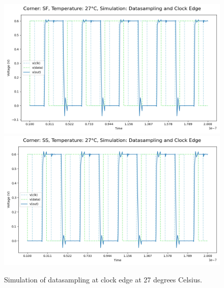 \begin{figure}[H]
    \vspace{5pt}
    \includegraphics[height= 0.21\textheight]{figures/aimspice/0.600_0.1u_0.1u_0.3u_0.1u/functionality/SF27W1.png}
    \vspace{5pt}
    \includegraphics[height= 0.21\textheight]{figures/aimspice/0.600_0.1u_0.1u_0.3u_0.1u/functionality/SS27W1.png}
    \caption{Simulation of datasampling at clock edge at 27 degrees Celsius.}
    \label{fig:aimspice_W1_27}
\end{figure}

\pagebreak

